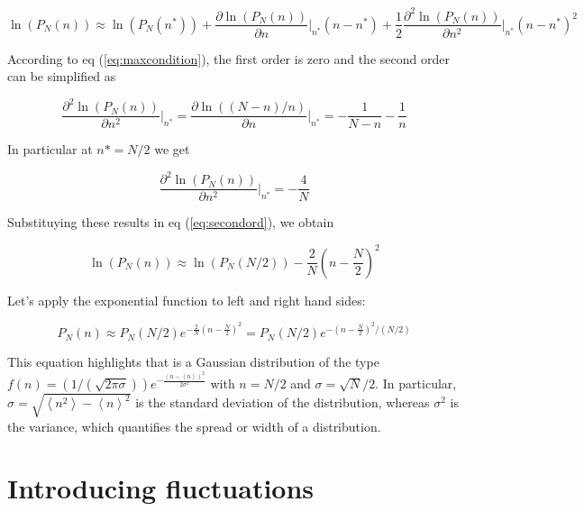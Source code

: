 \documentclass[12pt,a4paper]{report}
\newcommand{\esp}{\vspace{0.5cm}}
\begin{document}
\begin{equation}
	\ln(P_N(n)) \approx \ln(P_N(n^*)) + \frac{\partial \ln(P_N(n))}{\partial n}\Big|_{n^*}(n-n^*)+\frac{1}{2}\frac{\partial^2 \ln(P_N(n))}{\partial n^2}\Big|_{n^*}(n-n^*)^2
	\label{eq:secondord}
\end{equation}

According to eq (\ref{eq:maxcondition}), the first order is zero and the second order can be simplified as 

\esp

\begin{equation}
	\frac{\partial^2 \ln(P_N(n))}{\partial n^2}\Big|_{n^*} = \frac{\partial \ln((N-n)/n)}{\partial n}\Big|_{n^*} = -\frac{1}{N-n}-\frac{1}{n}
\end{equation}

\esp

\noindent In particular at $n*= N/2$ we get

\begin{equation}
	\frac{\partial^2 \ln(P_N(n))}{\partial n^2}\Big|_{n^*} = -\frac{4}{N}
\end{equation}

\esp

\noindent Substituying these results in eq (\ref{eq:secondord}), we obtain

\begin{equation}
	\ln(P_N(n)) \approx \ln(P_N(N/2)) - \frac{2}{N}\left(n-\frac{N}{2}\right)^2 
\end{equation}

\esp

\noindent Let’s apply the exponential function to left and right hand sides:

\begin{equation}
	P_N(n) \approx P_N(N/2)e^{-\frac{2}{N}\left(n-\frac{N}{2}\right)^2} = P_N(N/2)e^{-\left(n-\frac{N}{2}\right)^2/ (N/2)}
\end{equation}

\esp

This equation highlights that is a Gaussian distribution of the type $f(n) = (1/(\sqrt{2\pi\sigma})) e^{- \frac{(n - \left< n \right>)^2}{2 \sigma^2}}$
with $n =N/2$ and $\sigma = \sqrt{N}/2$. In particular, $\sigma = \sqrt{\left< n^2 \right> - \left< n \right>^2}$ is the standard deviation of the distribution, whereas $\sigma^2$ is the variance, which quantifies the spread or width of a distribution.

\section{Introducing fluctuations}
\end{document}
